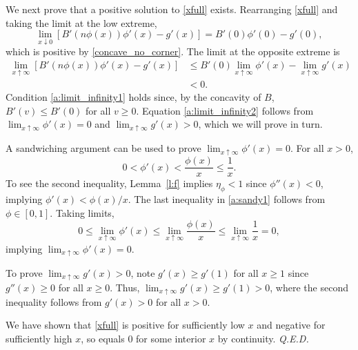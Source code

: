 \documentclass[12pt]{article}
\renewcommand{\qed}{{\it Q.E.D.}}
\newcommand{\efficacy}{\phi}
\newcommand{\general}{g}
\newcommand{\benefit}{B}
\newcommand{\elasticity}[1]{\eta_{#1}}
\begin{document}
We next prove that a positive solution to \eqref{xfull}
exists. Rearranging \eqref{xfull} and taking the limit at the low
extreme,
\begin{equation}
\label{a:limit0}
\lim_{x \downarrow 0} \left[ \benefit'(n\efficacy(x)) \efficacy'(x) -
  \general'(x) \right] = \benefit'(0) \efficacy'(0) - \general'(0),
\end{equation}
which is positive by \eqref{concave_no_corner}. The limit at the
opposite extreme is
\begin{align}
\lim_{x \uparrow \infty} \left[ \benefit'(n \efficacy(x)) \efficacy'(x) - \general'(x) \right] & \leq B'(0) \lim_{x \uparrow \infty} \efficacy'(x) - \lim_{x \uparrow \infty} \general'(x) \label{a:limit_infinity1} \\
& < 0. \label{a:limit_infinity2} 
\end{align}
Condition \eqref{a:limit_infinity1} holds since, by the concavity of
$\benefit$, $\benefit'(v) \leq \benefit'(0)$ for all $v \geq
0$. Equation \eqref{a:limit_infinity2} follows from $\lim_{x \uparrow
  \infty} \efficacy'(x) = 0$ and $\lim_{x \uparrow \infty}
\general'(x) > 0$, which we will prove in turn.

A sandwiching argument can be used to prove $\lim_{x \uparrow \infty}
\efficacy'(x) = 0$.
For all $x > 0$,
\begin{equation}
\label{a:sandy1}
0 < \efficacy'(x) < \frac{\efficacy(x)}{x} \leq \frac{1}{x}.
\end{equation}
To see the second inequality, Lemma~\ref{l:f} implies
$\elasticity{\efficacy} < 1$ since $\efficacy''(x) < 0$, implying
$\efficacy'(x) < \efficacy(x) / x$. The last inequality in
\eqref{a:sandy1} follows from $\efficacy \in [0,1]$. Taking limits,
\begin{equation}
\label{a:sandy_limit}
0 \leq \lim_{x \uparrow \infty} \efficacy'(x) \leq \lim_{x \uparrow
  \infty} \frac{\efficacy(x)}{x} \leq \lim_{x \uparrow \infty}
\frac{1}{x} = 0,
\end{equation}
implying $\lim_{x \uparrow \infty} \efficacy'(x) = 0$. 

To prove $\lim_{x \uparrow \infty} \general'(x) > 0$, note
$\general'(x) \geq \general'(1)$ for all $x \geq 1$ since
$\general''(x) \geq 0$ for all $x \geq 0$. Thus, $\lim_{x \uparrow
  \infty} \general'(x) \geq \general'(1) > 0$, where the second
inequality follows from $\general'(x) > 0$ for all $x > 0$.

We have shown that \eqref{xfull} is positive for sufficiently low $x$
and negative for sufficiently high $x$, so equals 0 for some interior
$x$ by continuity. \qed
\end{document}
